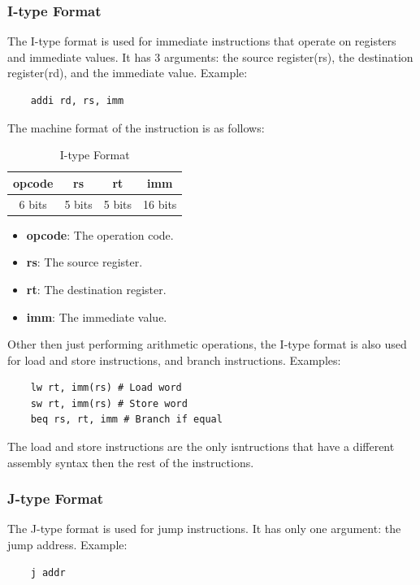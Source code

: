 \subsubsection{I-type Format}
The I-type format is used for immediate instructions that operate on registers and immediate values. It has 3 arguments: the source register(rs), the destination register(rd), and the immediate value. Example:
\begin{verbatim}
    addi rd, rs, imm
\end{verbatim}

The machine format of the instruction is as follows:
\begin{table}[H]
    \centering
    \begin{tabular}{|c|c|c|c|}
    \hline
    \textbf{opcode} & \textbf{rs} & \textbf{rt} & \textbf{imm} \\ \hline
    6 bits         & 5 bits     & 5 bits     & 16 bits     \\ \hline
    \end{tabular}
    \caption{I-type Format}
    \label{tab:i_type_format}
\end{table}

\begin{itemize}
    \item \textbf{opcode}: The operation code.
    \item \textbf{rs}: The source register.
    \item \textbf{rt}: The destination register.
    \item \textbf{imm}: The immediate value.
\end{itemize}
Other then just performing arithmetic operations, the I-type format is also used for load and store instructions, and branch instructions. \newline
Examples:
\begin{verbatim}
    lw rt, imm(rs) # Load word
    sw rt, imm(rs) # Store word
    beq rs, rt, imm # Branch if equal
\end{verbatim}
The load and store instructions are the only isntructions that have a different assembly syntax then the rest of the instructions.

\subsubsection{J-type Format}
The J-type format is used for jump instructions. It has only one argument: the jump address. Example:
\begin{verbatim}
    j addr
\end{verbatim}

